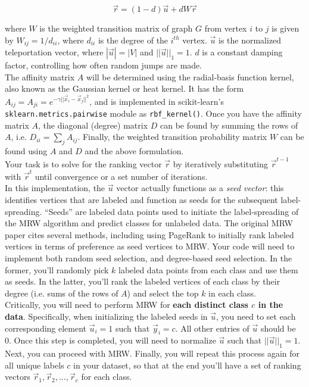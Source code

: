 \documentclass[paper=a4, fontsize=11pt]{scrartcl} %
\numberwithin{figure}{section} %
\numberwithin{table}{section} %
\begin{document}
$$
\vec{r} = (1 - d)\vec{u} + dW\vec{r}
$$

where $W$ is the weighted transition matrix of graph $G$ from vertex $i$ to $j$ is given by $W_{ij} = 1/d_{ii}$, where $d_{ii}$ is the degree of the $i^{th}$ vertex. $\vec{u}$ is the normalized teleportation vector, where $|\vec{u}| = |V|$ and $||\vec{u}||_1 = 1$. $d$ is a constant damping factor, controlling how often random jumps are made. \\

The affinity matrix $A$ will be determined using the radial-basis function kernel, also known as the Gaussian kernel or heat kernel. It has the form $A_{ij} = A_{ji} = e^{-\gamma ||\vec{x}_i - \vec{x}_j||^2}$, and is implemented in scikit-learn's \texttt{sklearn.metrics.pairwise} module as \texttt{rbf\_kernel()}. Once you have the affinity matrix $A$, the diagonal (degree) matrix $D$ can be found by summing the rows of $A$, i.e. $D_{ii} = \sum_j A_{ij}$. Finally, the weighted transition probability matrix $W$ can be found using $A$ and $D$ and the above formulation. \\

Your task is to solve for the ranking vector $\vec{r}$ by iteratively substituting $\vec{r}^{t - 1}$ with $\vec{r}^t$ until convergence or a set number of iterations. \\

In this implementation, the $\vec{u}$ vector actually functions as a \emph{seed vector}: this identifies vertices that are labeled and function as seeds for the subsequent label-spreading. ``Seeds'' are labeled data points used to initiate the label-spreading of the MRW algorithm and predict classes for unlabeled data. The original MRW paper cites several methods, including using PageRank to initially rank labeled vertices in terms of preference as seed vertices to MRW. Your code will need to implement both random seed selection, and degree-based seed selection. In the former, you'll randomly pick $k$ labeled data points from each class and use them as seeds. In the latter, you'll rank the labeled vertices of each class by their degree (i.e. sums of the rows of $A$) and select the top $k$ in each class. \\

Critically, you will need to perform MRW for \textbf{each distinct class $c$ in the data}. Specifically, when initializing the labeled seeds in $\vec{u}$, you need to set each corresponding element $\vec{u}_i = 1$ such that $\vec{y}_i = c$. All other entries of $\vec{u}$ should be 0. Once this step is completed, you will need to normalize $\vec{u}$ such that $||\vec{u}||_1 = 1$. Next, you can proceed with MRW. Finally, you will repeat this process again for all unique labels $c$ in your dataset, so that at the end you'll have a set of ranking vectors $\vec{r}_1, \vec{r}_2, ..., \vec{r}_c$ for each class. \\
\end{document}
